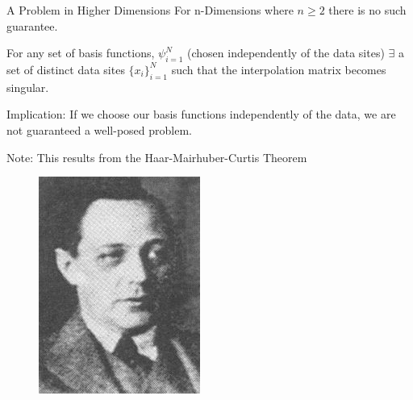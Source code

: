 \documentclass[12pt,t]{beamer}
\newcommand{\subt}[1]{{\footnotesize \color{subtitle} {#1}}}
\begin{document}
\begin{frame}{A Problem in Higher Dimensions}
For n-Dimensions where $n\geq 2$ there is no such guarantee.
\bigskip

For any set of basis functions, $\psi_{i=1}^N$ (chosen independently of the data sites) $\exists$ a set of distinct data sites $\{x_i\}_{i=1}^N$
such that the interpolation matrix becomes singular. 
\bigskip

\subt{Implication:}
If we choose our basis functions independently of the data, we are not guaranteed a well-posed problem.
\bigskip

\subt{Note:}
This results from the Haar-Mairhuber-Curtis Theorem
\begin{figure}[!htb]
  \includegraphics[width=\linewidth]{Haar.jpg}
\endminipage\hfill
{}

\end{figure}
\end{frame}
\end{document}
